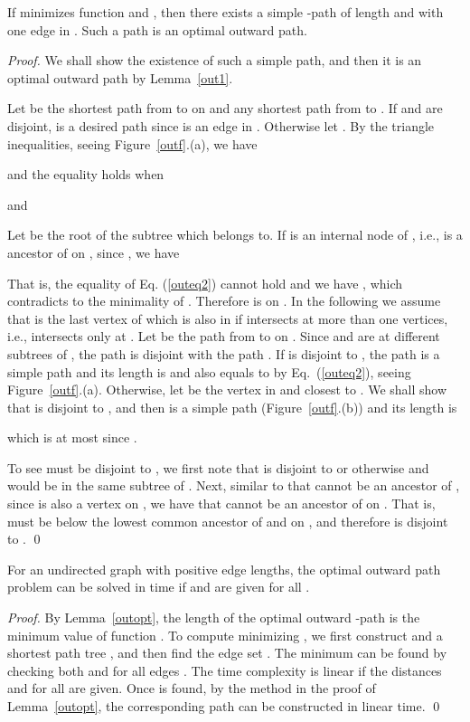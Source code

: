 \begin{lemma}\label{outopt}
If  minimizes function  and , then there exists a simple -path of length  and with one edge in . Such a path is an optimal outward path.  
\end{lemma}
\begin{proof}
We shall show the existence of such a simple path, and then it is an optimal outward path by Lemma~\ref{out1}.

Let  be the shortest path from  to  on  and  any shortest path from  to . If  and  are disjoint,  is a desired path since  is an edge in .
Otherwise let .
By the triangle inequalities, seeing Figure~\ref{outf}.(a), we have 

and the equality holds when 

and 


Let  be the root of the subtree which  belongs to. If  is an internal node of , i.e.,  is a ancestor of  on , since , we have 

That is, the equality of Eq. (\ref{outeq2}) cannot hold and we have , which contradicts to the minimality of .
Therefore  is on .
In the following we assume that  is the last vertex of  which is also in  if  intersects  at more than one vertices, i.e.,  intersects  only at .
Let  be the path from  to  on . 
Since  and  are at different subtrees of , the path  is disjoint with the path . 
If  is disjoint to , the path  is a simple path and its length is  and also equals to  by Eq.~(\ref{outeq2}), seeing Figure~\ref{outf}.(a).
Otherwise, let  be the vertex in  and closest to .
We shall show that  is disjoint to , and then  is a simple path (Figure~\ref{outf}.(b)) and its length is 

which is at most  since .

To see  must be disjoint to , we first note that  is disjoint to  or otherwise  and  would be in the same subtree of .
Next, similar to that  cannot be an ancestor of , since  is also a vertex on ,  we have that  cannot be an ancestor of  on . That is,  must be below the lowest common ancestor of  and  on , and therefore  is disjoint to .  
\qed  
\end{proof}


\begin{theorem}\label{thm:out}
For an undirected graph with positive edge lengths, the optimal outward path problem can be solved in  time if  and  are given for all .  
\end{theorem}
\begin{proof}
By Lemma~\ref{outopt}, the length of the optimal outward -path is the minimum value of function . To compute  minimizing , we first construct  and a shortest path tree , and then find the edge set . The minimum can be found by checking both  and  for all edges . The time complexity is linear if the distances  and  for all  are given.
Once  is found, by the method in the proof of Lemma~\ref{outopt}, the corresponding path can be constructed in linear time.
\qed\end{proof}

